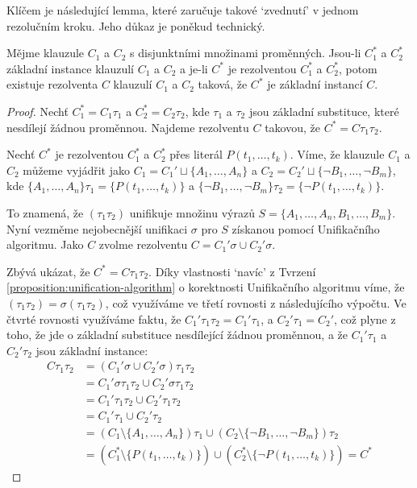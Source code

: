 Klíčem je následující lemma, které zaručuje takové `zvednutí' v jednom rezolučním kroku. Jeho důkaz je poněkud technický. 

\begin{lemma}\label{lemma:lifting-lemma}
Mějme klauzule $C_1$ a $C_2$ s disjunktními množinami proměnných. Jsou-li $C^*_1$ a $C^*_2$ základní instance klauzulí $C_1$ a $C_2$ a je-li $C^*$ je rezolventou $C^*_1$ a $C^*_2$, potom existuje rezolventa $C$ klauzulí $C_1$ a $C_2$ taková, že $C^*$ je základní instancí $C$.
\end{lemma}
\begin{proof}
Nechť $C^*_1=C_1\tau_1$ a $C^*_2=C_2\tau_2$, kde $\tau_1$ a $\tau_2$ jsou základní substituce, které nesdílejí žádnou proměnnou. Najdeme rezolventu $C$ takovou, že $C^*=C\tau_1\tau_2$.

Nechť $C^*$ je rezolventou $C_1^*$ a $C_2^*$ přes literál $P(t_1,\dots,t_k)$. Víme, že klauzule $C_1$ a $C_2$ můžeme vyjádřit jako $C_1=C_1' \sqcup \{A_1,\dots,A_n\}$ a $C_2=C_2' \sqcup \{\neg B_1,\dots,\neg B_m\}$, kde $\{A_1,\dots,A_n\}\tau_1=\{P(t_1,\dots,t_k)\}$ a $\{\neg B_1,\dots,\neg B_m\}\tau_2=\{\neg P(t_1,\dots,t_k)\}$.

To znamená, že $(\tau_1\tau_2)$ unifikuje množinu výrazů $S=\{A_1,\dots,A_n,B_1,\dots,B_m\}$. Nyní vezměme nejobecnější unifikaci $\sigma$ pro $S$ získanou pomocí Unifikačního algoritmu. Jako $C$ zvolme rezolventu $C=C_1'\sigma \cup C_2'\sigma$.

Zbývá ukázat, že $C^*=C\tau_1\tau_2$. Díky vlastnosti `navíc' z Tvrzení \ref{proposition:unification-algorithm} o korektnosti Unifikačního algoritmu víme, že $(\tau_1\tau_2)=\sigma(\tau_1\tau_2)$, což využíváme ve třetí rovnosti z následujícího výpočtu. Ve čtvrté rovnosti využíváme faktu, že $C_1'\tau_1\tau_2=C_1'\tau_1$, a $C_2'\tau_1=C_2'$, což plyne z toho, že jde o základní substituce nesdílející žádnou proměnnou, a že $C_1'\tau_1$ a $C_2'\tau_2$ jsou základní instance:
\begin{align*}
    C\tau_1\tau_2&= (C_1'\sigma \cup C_2'\sigma)\tau_1\tau_2\\
    &=C_1'\sigma\tau_1\tau_2 \cup C_2'\sigma\tau_1\tau_2\\
    &=C_1'\tau_1\tau_2 \cup C_2'\tau_1\tau_2\\
    &=C_1'\tau_1 \cup C_2'\tau_2\\
    &=(C_1\setminus\{A_1,\dots,A_n\})\tau_1\cup (C_2\setminus\{\neg B_1,\dots,\neg B_m\})\tau_2\\
    &=(C_1^*\setminus\{P(t_1,\dots,t_k)\})\cup(C_2^*\setminus \{\neg P(t_1,\dots,t_k)\})=C^*
\end{align*}
\end{proof}

